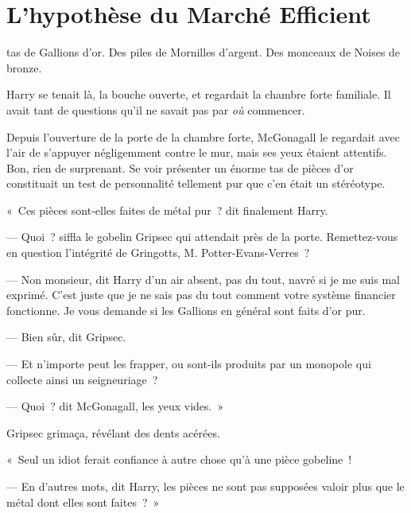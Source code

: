 \chapter[L'hypothèse du Marché Efficient]{L'hypothèse du Marché Efficient\protect\footnotemark}

 tas de Gallions d'or. Des piles de Mornilles d'argent. Des monceaux de Noises de bronze.

\hplettrineextrapara
Harry se tenait là, la bouche ouverte, et regardait la chambre forte familiale. Il avait tant de questions qu'il ne savait pas par \emph{où} commencer.

Depuis l'ouverture de la porte de la chambre forte, McGonagall le regardait avec l'air de s'appuyer négligemment contre le mur, mais ses yeux étaient attentifs. Bon, rien de surprenant. Se voir présenter un énorme tas de pièces d'or constituait un test de personnalité tellement pur que c'en était un stéréotype.

«~Ces pièces sont-elles faites de métal pur~? dit finalement Harry.

--- Quoi~? siffla le gobelin Gripsec qui attendait près de la porte. Remettez-vous en question l'intégrité de Gringotts, M. Potter-Evans-Verres~?

--- Non monsieur, dit Harry d'un air absent, pas du tout, navré si je me suis mal exprimé. C'est juste que je ne sais pas du tout comment votre système financier fonctionne. Je vous demande si les Gallions en général sont faits d'or pur.

--- Bien sûr, dit Gripsec.

--- Et n'importe peut les frapper, ou sont-ils produits par un monopole qui collecte ainsi un seigneuriage~?

--- Quoi~? dit McGonagall, les yeux vides.~»

Gripsec grimaça, révélant des dents acérées.

«~Seul un idiot ferait confiance à autre chose qu'à une pièce gobeline~!

--- En d'autres mots, dit Harry, les pièces ne sont pas supposées valoir plus que le métal dont elles sont faites~?~»

